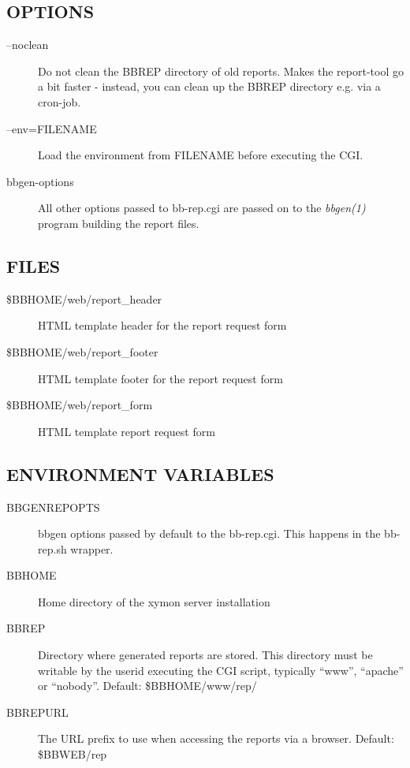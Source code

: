 \subsection{OPTIONS}
\begin{description}
\item[--noclean] Do not clean the BBREP directory of old reports. Makes the report-tool go a bit faster - instead, you can clean up the BBREP directory e.g. via a cron-job. 

 

\item[--env=FILENAME] Load the environment from FILENAME before executing the CGI. 

 

\item[bbgen-options] All other options passed to bb-rep.cgi are passed on to the \emph{bbgen(1)}
 program building the report files. 

 


\end{description}
\subsection{FILES}
\begin{description}
\item[\$BBHOME/web/report\_header] HTML template header for the report request form 

 

\item[\$BBHOME/web/report\_footer] HTML template footer for the report request form 

 

\item[\$BBHOME/web/report\_form] HTML template report request form 

 


\end{description}
\subsection{ENVIRONMENT VARIABLES}
\begin{description}
\item[BBGENREPOPTS] bbgen options passed by default to the bb-rep.cgi. This happens in the bb-rep.sh wrapper. 
\item[BBHOME] Home directory of the xymon server installation 
\item[BBREP] Directory where generated reports are stored. This directory must be writable by the userid executing the CGI script, typically ``www'', ``apache'' or ``nobody''. Default: \$BBHOME/www/rep/ 
\item[BBREPURL] The URL prefix to use when accessing the reports via a browser. Default: \$BBWEB/rep 


\end{description}
